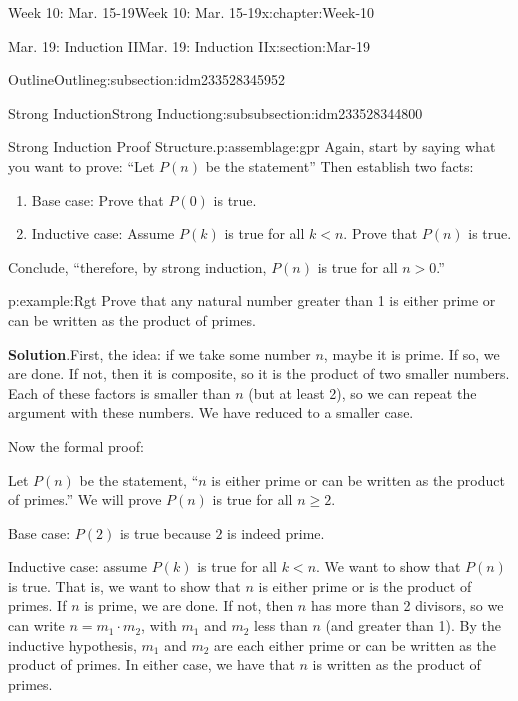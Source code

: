 \documentclass[oneside,10pt,]{book}
\newcommand{\blocktitlefont}{\relax}
\numberwithin{equation}{section}
\renewcommand{\ge}{\geqslant}
\newcommand{\lt}{<}
\newcommand{\gt}{>}
\begin{document}
\begin{chapterptx}{Week 10: Mar. 15-19}{}{Week 10: Mar. 15-19}{}{}{x:chapter:Week-10}
\begin{sectionptx}{Mar. 19: Induction II}{}{Mar. 19: Induction II}{}{}{x:section:Mar-19}
\begin{subsectionptx}{Outline}{}{Outline}{}{}{g:subsection:idm233528345952}
%
%
\typeout{************************************************}
\typeout{************************************************}
%
\begin{subsubsectionptx}{Strong Induction}{}{Strong Induction}{}{}{g:subsubsection:idm233528344800}
\begin{assemblage}{Strong Induction Proof Structure.}{p:assemblage:gpr}%
Again, start by saying what you want to prove: ``Let \(P(n)\) be the statement\textellipsis{}'' Then establish two facts:%
\begin{enumerate}
\item{}Base case: Prove that \(P(0)\) is true. %
\item{}Inductive case: Assume \(P(k)\) is true for all \(k \lt n\). Prove that \(P(n)\) is true. %
\end{enumerate}
Conclude, ``therefore, by strong induction, \(P(n)\) is true for all \(n \gt 0\).''%
\end{assemblage}
\begin{example}{}{p:example:Rgt}%
Prove that any natural number greater than 1 is either prime  or can be written as the product of primes.%
\par\smallskip%
\noindent\textbf{\blocktitlefont Solution}.\hypertarget{p:solution:usW}{}\quad{}First, the idea: if we take some number \(n\), maybe it is prime. If so, we are done. If not, then it is composite, so it is the product of two smaller numbers. Each of these factors is smaller than \(n\) (but at least 2), so we can repeat the argument with these numbers. We have reduced to a smaller case.%
\par
Now the formal proof:%
\par
Let \(P(n)\) be the statement, ``\(n\) is either prime or can be written as the product of primes.'' We will prove \(P(n)\) is true for all \(n \ge 2\).%
\par
Base case: \(P(2)\) is true because \(2\) is indeed prime.%
\par
Inductive case: assume \(P(k)\) is true for all \(k \lt n\). We want to show that \(P(n)\) is true. That is, we want to show that \(n\) is either prime or is the product of primes. If \(n\) is prime, we are done. If not, then \(n\) has more than 2 divisors, so we can write \(n = m_1 \cdot m_2\), with \(m_1\) and \(m_2\) less than \(n\) (and greater than 1). By the inductive hypothesis, \(m_1\) and \(m_2\) are each either prime or can be written as the product of primes. In either case, we have that \(n\) is written as the product of primes.%

\end{example}
\end{subsubsectionptx}
\end{subsectionptx}
\end{sectionptx}
\end{chapterptx}
\end{document}
